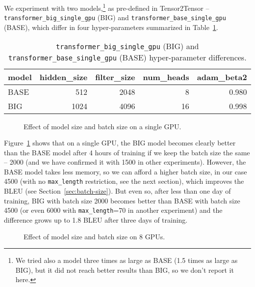 \documentclass{pbmlarxiv} \pdfoutput=1
\def\Sref#1{Section~\ref{#1}}
\def\Tref#1{Table~\ref{#1}}
\begin{document}
We experiment with two models,\footnote{
 We tried also a model three times as large as BASE (1.5 times as large as BIG),
  but it did not reach better results than BIG, so we don't report it here.
}
 as pre-defined in Tensor2Tensor --
 \texttt{trans\-for\-mer\-\_big\-\_sin\-gle\-\_gpu} (BIG) and
 \texttt{trans\-for\-mer\_ba\-se\_sin\-gle\_gpu} (BASE),
 which differ in four hyper-parameters summarized in \Tref{tab:big-vs-base}.

\begin{table}[htb]\centering
\begin{tabular}{lrrrr}\hline
model & hidden\_size & filter\_size & num\_heads & adam\_beta2 \\\hline
BASE  &          512 &         2048 &          8 & 0.980 \\
BIG   &         1024 &         4096 &         16 & 0.998 \\\hline
\end{tabular}
\caption{\texttt{transformer\_big\_single\_gpu} (BIG)
and \texttt{transformer\_base\_single\_gpu} (BASE) hyper-parameter differences.}
\label{tab:big-vs-base}
\end{table}

\begin{figure}
\vspace{-5mm}
\caption{Effect of model size and batch size on a single GPU.}
\label{fig:1GPU-big2000-base4500-base2000}
\end{figure}

Figure~\ref{fig:1GPU-big2000-base4500-base2000} shows
 that on a single GPU, the BIG model becomes clearly better than the BASE model
 after 4 hours of training if we keep the batch size the same -- 2000
 (and we have confirmed it with 1500 in other experiments).
However, the BASE model takes less memory, so we can afford a higher batch size,
 in our case 4500 (with no \verb|max_length| restriction, see the next section),
 which improves the BLEU (see \Sref{sec:batch-size}).
But even so, after less than one day of training, BIG with batch size 2000 becomes better
 than BASE with batch size 4500 (or even 6000 with \verb|max_length|=70 in another experiment)
 and the difference grows up to 1.8 BLEU after three days of training.

\begin{figure}
\vspace{-5mm}
\caption{Effect of model size and batch size on 8 GPUs.}
\label{fig:8GPU-big1500-base4500}
\end{figure}
\end{document}
